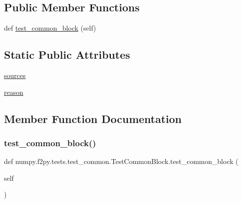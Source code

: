 \subsection*{Public Member Functions}
\begin{DoxyCompactItemize}
\item 
def \hyperlink{classnumpy_1_1f2py_1_1tests_1_1test__common_1_1TestCommonBlock_a95e174b7b739f50d2836d1370cc81652}{test\+\_\+common\+\_\+block} (self)
\end{DoxyCompactItemize}
\subsection*{Static Public Attributes}
\begin{DoxyCompactItemize}
\item 
\hyperlink{classnumpy_1_1f2py_1_1tests_1_1test__common_1_1TestCommonBlock_a67536cf8f9e833aad99b85ad39fc7baa}{sources}
\item 
\hyperlink{classnumpy_1_1f2py_1_1tests_1_1test__common_1_1TestCommonBlock_aea05854aab40f26b8589b3ef5cd75709}{reason}
\end{DoxyCompactItemize}


\subsection{Member Function Documentation}
\mbox{\label{classnumpy_1_1f2py_1_1tests_1_1test__common_1_1TestCommonBlock_a95e174b7b739f50d2836d1370cc81652}} 
\subsubsection{\texorpdfstring{test\+\_\+common\+\_\+block()}{test\_common\_block()}}
{\footnotesize\ttfamily def numpy.\+f2py.\+tests.\+test\+\_\+common.\+Test\+Common\+Block.\+test\+\_\+common\+\_\+block (\begin{DoxyParamCaption}\item[{}]{self }\end{DoxyParamCaption})}



